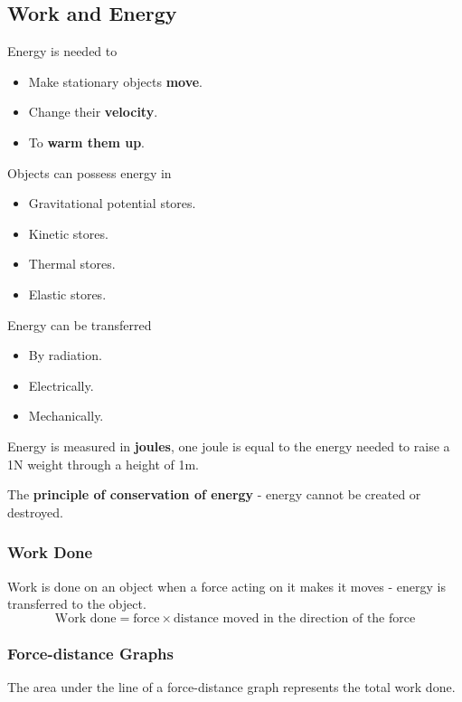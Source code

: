 \subsection{Work and Energy}

Energy is needed to
\begin{itemize}
    \item Make stationary objects \textbf{move}.
    \item Change their \textbf{velocity}.
    \item To \textbf{warm them up}.
\end{itemize}

Objects can possess energy in
\begin{itemize}
    \item Gravitational potential stores.
    \item Kinetic stores.
    \item Thermal stores.
    \item Elastic stores.
\end{itemize}

Energy can be transferred
\begin{itemize}
    \item By radiation.
    \item Electrically.
    \item Mechanically.
\end{itemize}

Energy is measured in \textbf{joules}, one joule is equal to the energy needed to raise a 1N weight through a height of 1m.

The \textbf{principle of conservation of energy} - energy cannot be created or destroyed.

\subsubsection*{Work Done}

Work is done on an object when a force acting on it makes it moves - energy is transferred to the object.
$$\text{Work done}=\text{force}\times\text{distance moved in the direction of the force}$$

\subsubsection*{Force-distance Graphs}

The area under the line of a force-distance graph represents the total work done.
